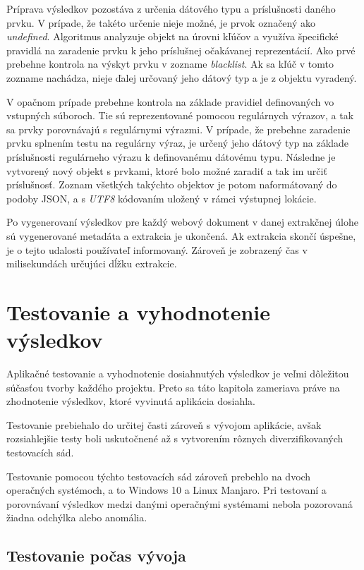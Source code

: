 Príprava výsledkov pozostáva z určenia dátového typu a príslušnosti daného prvku. V prípade, že takéto určenie nieje možné, je prvok označený ako \textit{undefined}. Algoritmus analyzuje objekt na úrovni kľúčov a využíva špecifické pravidlá na zaradenie prvku k jeho príslušnej očakávanej reprezentácií. Ako prvé prebehne kontrola na výskyt prvku v zozname \textit{blacklist}. Ak sa kľúč v tomto zozname nachádza, nieje ďalej určovaný jeho dátový typ a je z objektu vyradený. 

V opačnom prípade prebehne kontrola na základe pravidiel definovaných vo vstupných súboroch. Tie sú reprezentované pomocou regulárnych výrazov, a tak sa prvky porovnávajú s regulárnymi výrazmi. V prípade, že prebehne zaradenie prvku splnením testu na regulárny výraz, je určený jeho dátový typ na základe príslušnosti regulárneho výrazu k definovanému dátovému typu. Následne je vytvorený nový objekt s prvkami, ktoré bolo možné zaradiť a tak im určiť príslušnosť. Zoznam všetkých takýchto objektov je potom naformátovaný do podoby JSON, a s \textit{UTF8} kódovaním uložený v rámci výstupnej lokácie. 

\bigskip

Po vygenerovaní výsledkov pre každý webový dokument v danej extrakčnej úlohe sú vygenerované metadáta a extrakcia je ukončená. Ak extrakcia skončí úspešne, je o tejto udalosti používateľ informovaný. Zároveň je zobrazený čas v milisekundách určujúci dĺžku extrakcie.

\chapter{Testovanie a vyhodnotenie výsledkov}
\label{testing}

Aplikačné testovanie a vyhodnotenie dosiahnutých výsledkov je veľmi dôležitou súčasťou tvorby každého projektu. Preto sa táto kapitola zameriava práve na zhodnotenie výsledkov, ktoré vyvinutá aplikácia dosiahla. 

Testovanie prebiehalo do určitej časti zároveň s vývojom aplikácie, avšak rozsiahlejšie testy boli uskutočnené až s vytvorením rôznych diverzifikovaných testovacích sád.

Testovanie pomocou týchto testovacích sád zároveň prebehlo na dvoch operačných systémoch, a to Windows 10 a Linux Manjaro. Pri testovaní a porovnávaní výsledkov medzi danými operačnými systémami nebola pozorovaná žiadna odchýlka alebo anomália. 

\section{Testovanie počas vývoja}

